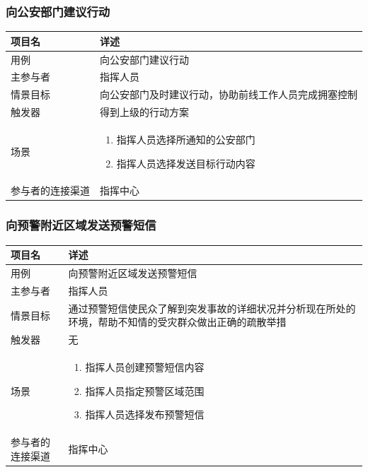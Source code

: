 \documentclass{ctexrep}
\begin{document}
\subsubsection{向公安部门建议行动}
\begin{longtable}{p{2cm} | p{10cm}}
\hline
项目名 & 详述 \\
\hline
\hline
用例 & 向公安部门建议行动\\
\hline
主参与者 & 指挥人员 \\
\hline
情景目标 &  向公安部门及时建议行动，协助前线工作人员完成拥塞控制\\
\hline
触发器 &  得到上级的行动方案\\
\hline
场景 & \begin{enumerate}
	\item 指挥人员选择所通知的公安部门
	\item 指挥人员选择发送目标行动内容
\end{enumerate} \\
\hline
参与者的连接渠道 & 指挥中心 \\
\hline
\end{longtable}

\subsubsection{向预警附近区域发送预警短信}
\begin{longtable}{p{2cm} | p{10cm}}
\hline
项目名 & 详述 \\
\hline
\hline
用例 & 向预警附近区域发送预警短信\\
\hline
主参与者 & 指挥人员 \\
\hline
情景目标 &  通过预警短信使民众了解到突发事故的详细状况并分析现在所处的环境，帮助不知情的受灾群众做出正确的疏散举措\\
\hline
触发器 &  无\\
\hline
场景 & \begin{enumerate}
	\item 指挥人员创建预警短信内容
	\item 指挥人员指定预警区域范围
	\item 指挥人员选择发布预警短信
\end{enumerate} \\
\hline
参与者的连接渠道 & 指挥中心 \\
\hline
\end{longtable}
\end{document}
